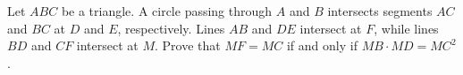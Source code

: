 Let $ABC$ be a triangle. A circle passing through $A$ and $B$ intersects segments $AC$ and $BC$ at $D$ and $E$,  respectively. Lines $AB$ and $DE$ intersect at $F$,  while lines $BD$ and $CF$ intersect at $M$. Prove that $MF = MC$ if and only if $MB\cdot MD = MC^2$.